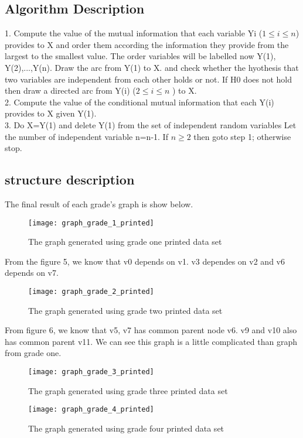 \documentclass{article}
\begin{document}
\subsection{Algorithm Description}
1. Compute the value of the mutual information that each variable
Yi ($ 1 \leq i \leq n $) provides to X and order them according the information
they provide from the largest to the smallest value. The order variables
will be labelled now Y(1), Y(2),...,Y(n). Draw the arc from Y(1) to X. and check whether
the hyothesis that two variables are independent from each other holds or not.
If H0 does not hold then draw a directed arc from Y(i) ($ 2 \leq i  \leq n$ ) to X.
\\2. Compute the value of the conditional mutual information that each
Y(i) provides to X given Y(1).
\\3. Do X=Y(1) and delete Y(1) from the set of independent random variables
Let the number of independent variable n=n-1. If $n \geq 2$ then goto step 1; otherwise
stop.
\subsection{structure description}
The final result of each grade's graph is show below.
\begin{figure}[h]
		\vskip 0.1in
		\centering
				\centerline{\texttt{[image: graph\_grade\_1\_printed]}}
				\caption{The graph generated using grade one printed data set}
		\vskip -0.1in
\end{figure}
From the figure 5, we know that v0 depends on
v1. v3 dependes on v2 and v6 depends on v7.
\begin{figure}[h]
		\centering
				\centerline{\texttt{[image: graph\_grade\_2\_printed]}}
				\caption{The graph generated using grade two printed data set}
\end{figure}
From figure 6, we know that v5, v7 has common parent
node v6. v9 and v10 also has common parent v11. We can
see this graph is a little complicated than graph from
grade one.
\begin{figure}[h]
		\begin{center}
				\centerline{\texttt{[image: graph\_grade\_3\_printed]}}
				\caption{The graph generated using grade three printed data set}
		\end{center}
\end{figure}
\begin{figure}[h]
		\begin{center}
				\centerline{\texttt{[image: graph\_grade\_4\_printed]}}
				\caption{The graph generated using grade four printed data set}
		\end{center}
\end{figure}
\end{document}
